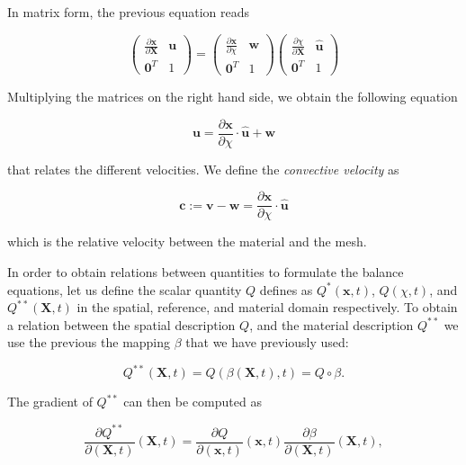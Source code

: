 \documentclass[a4paper,11pt,openright,twoside]{book}
\begin{document}
In matrix form, the previous equation reads

\begin{equation}
\begin{pmatrix}
\frac{\partial \mathbf{x}}{\partial \mathbf{X}} & \mathbf{u}\\
\mathbf{0}^T & 1
\end{pmatrix} = 
\begin{pmatrix}
\frac{\partial \mathbf{x}}{\partial \chi} & \mathbf{w}\\
\mathbf{0}^T & 1
\end{pmatrix}
\begin{pmatrix}
\frac{\partial \chi}{\partial \mathbf{X}} & \hat{\mathbf{u}}\\
\mathbf{0}^T & 1
\end{pmatrix}
\end{equation}

Multiplying the matrices on the right hand side, we obtain the following equation

\begin{equation}
\mathbf{u} = \frac{\partial \mathbf{x}}{\partial \chi} \cdot \hat{\mathbf{u}} + \mathbf{w}
\end{equation}

that relates the different velocities. We define the \emph{convective velocity} as

\begin{equation}
\mathbf{c} := \mathbf{v-w} = \frac{\partial \mathbf{x}}{\partial \chi} \cdot \hat{\mathbf{u}}
\end{equation}

which is the relative velocity between the material and the mesh.

In order to obtain relations between quantities to formulate the balance equations, let us define the scalar quantity $Q$ defines as $Q^{*}(\mathbf{x},t)$, $Q(\chi,t)$, and $Q^{**}(\mathbf{X},t)$ in the spatial, reference, and material domain respectively.
To obtain a relation between the spatial description $Q$, and the material description $Q^{**}$ we use the previous the mapping $\beta$ that we have previously used:

\begin{equation}
Q^{**}(\mathbf{X},t) = Q(\beta(\mathbf{X},t),t) = Q \circ \beta.
\end{equation}

The gradient of $Q^{**}$ can then be computed as

\begin{equation}
\label{eq:ale:1}
\frac{\partial Q^{**}}{\partial (\mathbf{X}, t)} (\mathbf{X},t) = 
\frac{\partial Q}{\partial (\mathbf{x}, t)} (\mathbf{x},t)
\frac{\partial \beta}{\partial (\mathbf{X}, t)} (\mathbf{X},t),
\end{equation}
\end{document}

